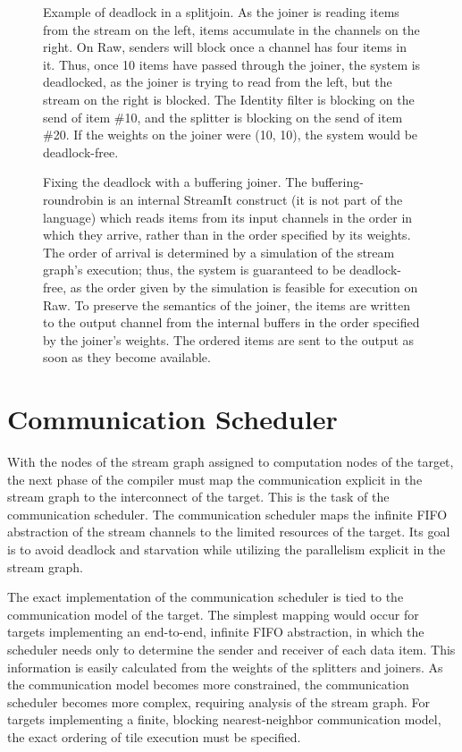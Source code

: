 \begin{figure}
\centering
{}
\parbox{6in}{\caption{\protect\small Example of deadlock in a
splitjoin.  As the joiner is reading items from the stream on the
left, items accumulate in the channels on the right.  On Raw, senders
will block once a channel has four items in it.  Thus, once 10 items
have passed through the joiner, the system is deadlocked, as the
joiner is trying to read from the left, but the stream on the right is
blocked.  The Identity filter is blocking on the send of item \#10,
and the splitter is blocking on the send of item \#20.  If the weights
on the joiner were (10, 10), the system would be deadlock-free.
\protect\label{fig:joiner-dead}}}

\vspace{48pt}

\caption{\protect\small Fixing the deadlock with a buffering joiner.
The buffering-roundrobin is an internal StreamIt construct (it is not
part of the language) which reads items from its input channels in the
order in which they arrive, rather than in the order specified by its
weights.  The order of arrival is determined by a simulation of the
stream graph's execution; thus, the system is guaranteed to be
deadlock-free, as the order given by the simulation is feasible for
execution on Raw.  To preserve the semantics of the joiner, the items
are written to the output channel from the internal buffers in the
order specified by the joiner's weights.  The ordered items are sent
to the output as soon as they become available.
\protect\label{fig:joiner-live}}
\end{figure}

\section{Communication Scheduler}
\label{sec:communic}

With the nodes of the stream graph assigned to computation nodes of
the target, the next phase of the compiler must map the communication
explicit in the stream graph to the interconnect of the target.  This
is the task of the communication scheduler.  The communication
scheduler maps the infinite FIFO abstraction of the stream channels to
the limited resources of the target.  Its goal is to avoid deadlock
and starvation while utilizing the parallelism explicit in the stream
graph.

The exact implementation of the communication scheduler is tied to the
communication model of the target.  The simplest mapping would occur
for targets implementing an end-to-end, infinite FIFO abstraction, in
which the scheduler needs only to determine the sender and receiver of
each data item.  This information is easily calculated from the
weights of the splitters and joiners.  As the communication model
becomes more constrained, the communication scheduler becomes more
complex, requiring analysis of the stream graph. For targets
implementing a finite, blocking nearest-neighbor communication model,
the exact ordering of tile execution must be specified.

